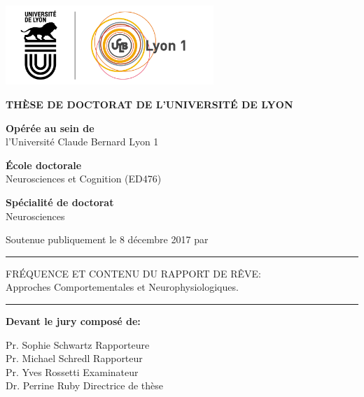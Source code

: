 \begin{titlepage}

  \setlength{\parindent}{0pt}
  \thispagestyle{empty}

  \begin{center}
  \includegraphics[height=3cm]{content/logo}
  \end{center}

  \bigskip

  \begin{center}
  \fontsize{14pt}{16pt}\selectfont
  \textbf{THÈSE DE DOCTORAT DE L'UNIVERSITÉ DE LYON}\\

  \bigskip

  \fontsize{12pt}{14pt}\selectfont
  \textbf{Opérée au sein de}\\ \medskip
  l'Université Claude Bernard Lyon 1

  \textbf{École doctorale}\\ \medskip
  Neurosciences et Cognition (ED476)

  \textbf{Spécialité de doctorat}\\ \medskip
  Neurosciences

  Soutenue publiquement le 8 décembre 2017 par\\ \medskip
  \fontsize{14pt}{16pt}\selectfont
  \textbf{\thesisName}

  \rule{\textwidth}{0.5pt}

  \fontsize{16pt}{20pt}\selectfont
  FRÉQUENCE ET CONTENU DU RAPPORT DE RÊVE:\\ \medskip
  Approches Comportementales et Neurophysiologiques.
  \rule{\textwidth}{0.5pt}

  \end{center}

  \fontsize{12pt}{14pt}\selectfont
  \textbf{Devant le jury composé de:}

  Pr. Sophie Schwartz  	\hfill Rapporteure\\
  Pr. Michael Schredl 	\hfill Rapporteur\\
  Pr. Yves Rossetti 	\hfill Examinateur\\
  Dr. Perrine Ruby 		\hfill Directrice de thèse\\

  \vfill

\end{titlepage}

\cleardoublepage

